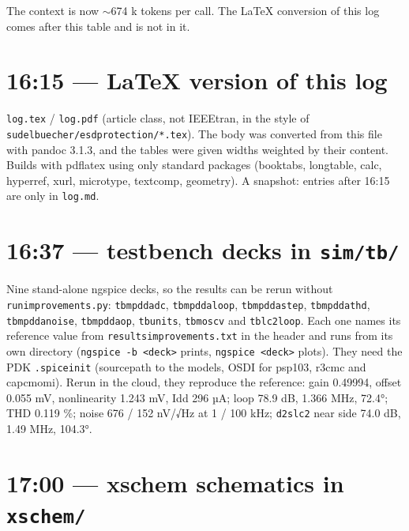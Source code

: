 \documentclass[11pt,a4paper]{article}
\renewcommand{\_}{\textunderscore\hspace{0pt}}
\begin{document}
The context is now $\sim$674 k tokens per
call. The LaTeX conversion of this log comes after
this table and is not in it.

\hypertarget{1615--latex-version-of-this-log}{%
\section{16:15 --- LaTeX version of this
log}\label{1615--latex-version-of-this-log}}

\texttt{log.tex} / \texttt{log.pdf} (article
class, not IEEEtran, in the style of
\texttt{sudelbuecher/esd\_protection/*.tex}). The
body was converted from this file with pandoc
3.1.3, and the tables were given widths weighted
by their content. Builds with pdflatex using only
standard packages (booktabs, longtable, calc,
hyperref, xurl, microtype, textcomp, geometry). A
snapshot: entries after 16:15 are only in
\texttt{log.md}.

\hypertarget{1637--testbench-decks-in-simtb}{%
\section{\texorpdfstring{16:37 --- testbench decks
in
\texttt{sim/tb/}}{16:37 --- testbench decks in sim/tb/}}\label{1637--testbench-decks-in-simtb}}

Nine stand-alone ngspice decks, so the results can
be rerun without \texttt{run\_improvements.py}:
\texttt{tb\_mpdda\_dc}, \texttt{tb\_mpdda\_loop},
\texttt{tb\_mpdda\_step}, \texttt{tb\_mpdda\_thd},
\texttt{tb\_mpdda\_noise}, \texttt{tb\_mpdda\_op},
\texttt{tb\_units}, \texttt{tb\_moscv} and
\texttt{tb\_lc2\_loop}. Each one names its
reference value from
\texttt{results\_improvements.txt} in the header
and runs from its own directory
(\texttt{ngspice\ -b\ \textless{}deck\textgreater{}}
prints,
\texttt{ngspice\ \textless{}deck\textgreater{}}
plots). They need the PDK \texttt{.spiceinit}
(sourcepath to the models, OSDI for psp103,
r3\_cmc and cap\_cmomi). Rerun in the cloud, they
reproduce the reference: gain 0.49994, offset
0.055 mV, nonlinearity 1.243 mV, Idd 296 µA; loop
78.9 dB, 1.366 MHz, 72.4°; THD 0.119 \%; noise 676
/ 152 nV/√Hz at 1 / 100 kHz; \texttt{d2s\_lc2}
near side 74.0 dB, 1.49 MHz, 104.3°.

\hypertarget{1700--xschem-schematics-in-xschem}{%
\section{\texorpdfstring{17:00 --- xschem
schematics in
\texttt{xschem/}}{17:00 --- xschem schematics in xschem/}}\label{1700--xschem-schematics-in-xschem}}
\end{document}
